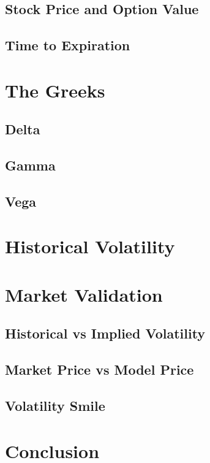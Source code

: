 \documentclass[11pt]{article}
\begin{document}
\subsection{Stock Price and Option Value}

\subsection{Time to Expiration}

\section{The Greeks}

\subsection{Delta}

\subsection{Gamma}

\subsection{Vega}

\section{Historical Volatility}

\section{Market Validation}

\subsection{Historical vs Implied Volatility}

\subsection{Market Price vs Model Price}

\subsection{Volatility Smile}

\section{Conclusion}
\end{document}
